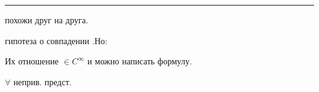 \noindent\rule{\linewidth}{0.4pt}

похожи друг на друга.

\par\noindent\begin{minipage}{\linewidth}
гипотеза о совпадении .\qquad Но:





\begin{flushright}\end{flushright}








Их отношение $\in C^\infty$ и можно написать формулу.
\end{minipage}





$\forall$ неприв. предст.

